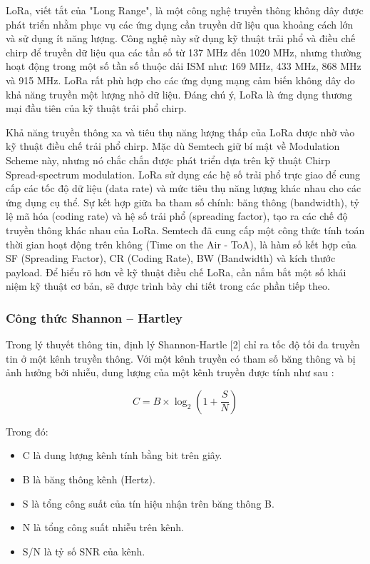 \documentclass{article} %
\begin{document}
	LoRa, viết tắt của "Long Range", là một công nghệ truyền thông không dây được phát triển nhằm phục vụ các ứng dụng cần truyền dữ liệu qua khoảng cách lớn và sử dụng ít năng lượng. Công nghệ này sử dụng kỹ thuật trải phổ và điều chế chirp để truyền dữ liệu qua các tần số từ 137 MHz đến 1020 MHz, nhưng thường hoạt động trong một số tần số thuộc dải ISM như: 169 MHz, 433 MHz, 868 MHz và 915 MHz. LoRa rất phù hợp cho các ứng dụng mạng cảm biến không dây do khả năng truyền một lượng nhỏ dữ liệu. Đáng chú ý, LoRa là ứng dụng thương mại đầu tiên của kỹ thuật trải phổ chirp.
	
	Khả năng truyền thông xa và tiêu thụ năng lượng thấp của LoRa được nhờ vào kỹ thuật điều chế trải phổ chirp. Mặc dù Semtech giữ bí mật về Modulation Scheme này, nhưng nó chắc chắn được phát triển dựa trên kỹ thuật Chirp Spread-spectrum modulation. LoRa sử dụng các hệ số trải phổ trực giao để cung cấp các tốc độ dữ liệu (data rate) và mức tiêu thụ năng lượng khác nhau cho các ứng dụng cụ thể. Sự kết hợp giữa ba tham số chính: băng thông (bandwidth), tỷ lệ mã hóa (coding rate) và hệ số trải phổ (spreading factor), tạo ra các chế độ truyền thông khác nhau của LoRa. Semtech đã cung cấp một công thức tính toán thời gian hoạt động trên không (Time on the Air - ToA), là hàm số kết hợp của SF (Spreading Factor), CR (Coding Rate), BW (Bandwidth) và kích thước payload. Để hiểu rõ hơn về kỹ thuật điều chế LoRa, cần nắm bắt một số khái niệm kỹ thuật cơ bản, sẽ được trình bày chi tiết trong các phần tiếp theo.
	
	
	\subsubsection{Công thức Shannon – Hartley}
	Trong lý thuyết thông tin, định lý Shannon-Hartle [2] chỉ ra tốc độ tối đa truyền tin ở một kênh truyền thông. Với một kênh truyền có tham số băng thông và bị ảnh hưởng bởi nhiễu, dung lượng của một kênh truyền được tính như sau \cite{semtech2015an1200}:
	
	\begin{equation}\label{Shannon_Hartley}
		C=B \times \log _2\left(1+\frac{S}{N}\right)
	\end{equation}
	
	Trong đó:
	\begin{itemize}
		\item C là dung lượng kênh tính bằng bit trên giây.
		\item B là băng thông kênh (Hertz).
		\item S là tổng công suất của tín hiệu nhận trên băng thông B.
		\item N là tổng công suất nhiễu trên kênh.
		\item S/N là tỷ số SNR của kênh.
	\end{itemize}
	
\end{document}

